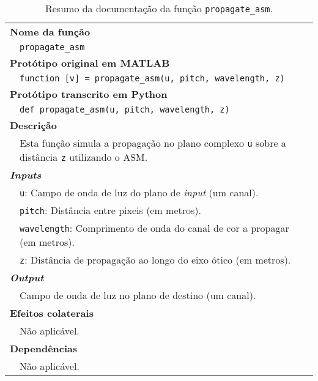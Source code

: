 \begin{table}[!hp]
    \centering
    \caption{Resumo da documentação da função \texttt{propagate\_asm}.}
    \label{tab:propagate_asm}
    \begin{tabular}{p{1cm} p{10cm}}
        \hline
        \multicolumn{2}{l}{\bfseries Nome da função}\\
         & \verb|propagate_asm|\\
        \hline
        \multicolumn{2}{l}{\bfseries Protótipo original em MATLAB}\\
         & \texttt{function [v] = propagate_asm(u, pitch, wavelength, z)}\\
        \hline
        \multicolumn{2}{l}{\bfseries Protótipo transcrito em Python}\\
         & \texttt{def propagate_asm(u, pitch, wavelength, z)} \\
        \hline\multicolumn{2}{l}{\bfseries Descrição}\\
         & Esta função simula a propagação no plano complexo \verb|u| sobre a distância \verb|z| utilizando o \ac{ASM}.\\
        \hline\multicolumn{2}{l}{\bfseries \textit{Inputs}}\\
         & \verb|u|: Campo de onda de luz do plano de \textit{input} (um canal).\\
         & \verb|pitch|: Distância entre pixeis (em metros).\\
         & \verb|wavelength|: Comprimento de onda do canal de cor a propagar (em metros).\\
         & \verb|z|: Distância de propagação ao longo do eixo ótico (em metros).\\
        \hline\multicolumn{2}{l}{\bfseries \textit{Output}}\\
         & Campo de onda de luz no plano de destino (um canal).\\
        \hline\multicolumn{2}{l}{\bfseries Efeitos colaterais}\\
         & Não aplicável. \\
        \hline\multicolumn{2}{l}{\bfseries Dependências}\\
         & Não aplicável. \\
        \hline
    \end{tabular}
\end{table}



